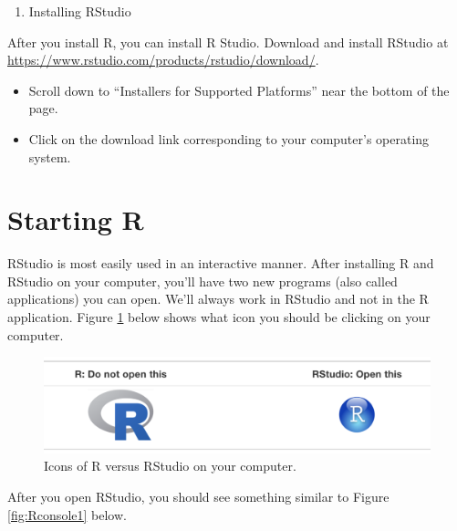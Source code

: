 \documentclass[]{book}
\providecommand{\tightlist}{%
  \setlength{\itemsep}{0pt}\setlength{\parskip}{0pt}}
\begin{document}
\begin{enumerate}
\def\labelenumi{\arabic{enumi}.}
\setcounter{enumi}{3}
\tightlist
\item
  Installing RStudio
\end{enumerate}

After you install R, you can install R Studio. Download and install
RStudio at \url{https://www.rstudio.com/products/rstudio/download/}.

\begin{itemize}
\tightlist
\item
  Scroll down to ``Installers for Supported Platforms'' near the bottom
  of the page.
\item
  Click on the download link corresponding to your computer's operating
  system.
\end{itemize}

\section{Starting R}\label{starting-r}

RStudio is most easily used in an interactive manner. After installing R
and RStudio on your computer, you'll have two new programs (also called
applications) you can open. We'll always work in RStudio and not in the
R application. Figure \ref{fig:Ricon} below shows what icon you should
be clicking on your computer.

\begin{figure}

{\centering \includegraphics[width=0.85\linewidth]{figures/Ricons} 

}

\caption{Icons of R versus RStudio on your computer.}\label{fig:Ricon}
\end{figure}

After you open RStudio, you should see something similar to Figure
\ref{fig:Rconsole1} below.
\end{document}
